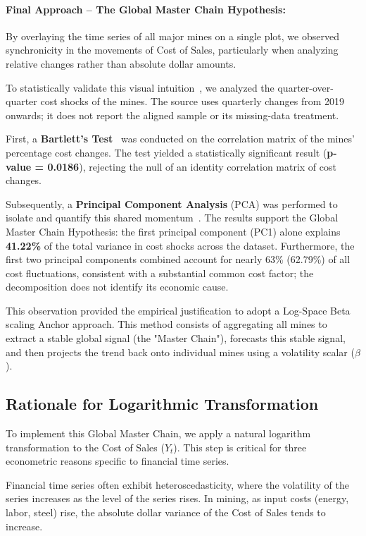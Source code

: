 \paragraph{Final Approach -- The Global Master Chain Hypothesis:}

By overlaying the time series of all major mines on a single plot, we observed synchronicity in the movements of Cost of Sales, particularly when analyzing relative changes rather than absolute dollar amounts. 

To statistically validate this visual intuition~\cite{Hair2019}, we analyzed the quarter-over-quarter cost shocks of the mines. The source uses quarterly changes from 2019 onwards; it does not report the aligned sample or its missing-data treatment.

First, a \textbf{Bartlett's Test}~\cite{Hair2019} was conducted on the correlation matrix of the mines' percentage cost changes. The test yielded a statistically significant result (\textbf{p-value = 0.0186}), rejecting the null of an identity correlation matrix of cost changes.

Subsequently, a \textbf{Principal Component Analysis} (PCA) was performed to isolate and quantify this shared momentum~\cite{Hair2019}. The results support the Global Master Chain Hypothesis: the first principal component (PC1) alone explains \textbf{41.22\% }of the total variance in cost shocks across the dataset. Furthermore, the first two principal components combined account for nearly 63\% (62.79\%) of all cost fluctuations, consistent with a substantial common cost factor; the decomposition does not identify its economic cause.

This observation provided the empirical justification to adopt a Log-Space Beta scaling Anchor approach. This method consists of aggregating all mines to extract a stable global signal (the "Master Chain"), forecasts this stable signal, and then projects the trend back onto individual mines using a volatility scalar ($\beta$).

\subsection{Rationale for Logarithmic Transformation}
To implement this Global Master Chain, we apply a natural logarithm transformation to the Cost of Sales ($Y_t$). This step is critical for three econometric reasons specific to financial time series.

Financial time series often exhibit heteroscedasticity, where the volatility of the series increases as the level of the series rises. In mining, as input costs (energy, labor, steel) rise, the absolute dollar variance of the Cost of Sales tends to increase.

